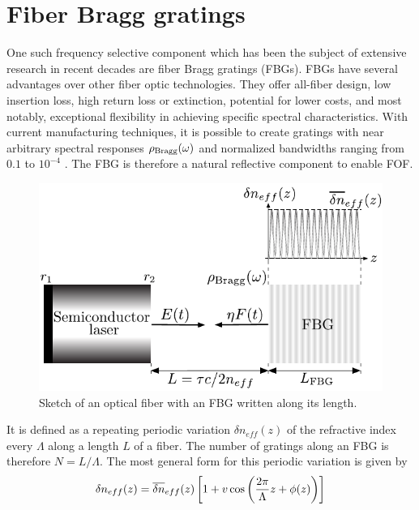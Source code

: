 \section*{Fiber Bragg gratings}
\label{sec:FBG}
%
One such frequency selective component which has been the subject of extensive research in recent decades are fiber Bragg gratings (FBGs). 
FBGs have several advantages over other fiber optic technologies. 
They offer all-fiber design, low insertion loss, high return loss or extinction,  potential for lower costs, and most notably, exceptional flexibility in achieving specific spectral characteristics. 
With current manufacturing techniques, it is possible to create gratings with near arbitrary spectral responses $\rho_\text{Bragg}(\omega)$ and normalized bandwidths ranging from $0.1$ to $10^{-4}$ \cite{erdogan1997fiber}. 
The FBG is therefore a natural reflective component to enable FOF.
%
\begin{figure}
    \centering 

    \includegraphics[width=\linewidth]{Images/FBG_setup_dneff_1col.pdf}

    \caption{Sketch of an optical fiber with an FBG written along its length.}

    \label{fig:FBG_setup}

\end{figure}
%
\par
%
It is defined as a repeating periodic variation $\delta n_{eff}(z)$ of the refractive index every $\Lambda$ along a length $L$ of a fiber. 
The number of gratings along an FBG is therefore $N = L/\Lambda$. The most general form for this periodic variation is given by
%
\begin{equation}
\label{eq:dneff}
    \delta n_{eff}(z) = \overline{\delta n}_{eff}(z) \left[ 1 + v \cos{\left( \frac{2 \pi}{\Lambda} z + \phi(z) \right)} \right]
\end{equation}
